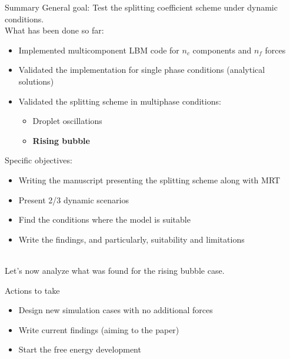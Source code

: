 \documentclass[8pt]{beamer}
\begin{document}
	\begin{frame}{Summary}
		General goal: Test the splitting coefficient scheme under dynamic conditions. \\
		
		What has been done so far:
		
		\begin{itemize}
			\item Implemented multicomponent LBM code for $n_c$ components and $n_f$ forces 
			\item Validated the implementation for single phase conditions (analytical solutions)
			\item Validated the splitting scheme in multiphase conditions: 
			\begin{itemize}
				\item Droplet oscillations
				\item \textbf{Rising bubble}
			\end{itemize}
		\end{itemize}
		
		Specific objectives:
		\begin{itemize}
			\item Writing the manuscript presenting the splitting scheme along with MRT 
			\item Present 2/3 dynamic scenarios 
			\item Find the conditions where the model is suitable
			\item Write the findings, and particularly, suitability and limitations
		\end{itemize}
		
		~\\
		Let's now analyze what was found for the rising bubble case.
	\end{frame}
	
	\begin{frame}{Actions to take}
		\begin{itemize}
			\item Design new simulation cases with no additional forces
			\item Write current findings (aiming to the paper)
			\item Start the free energy development
		\end{itemize}
	\end{frame}
	
	\begin{frame}{}
	
	\end{frame}
	
\end{document}
